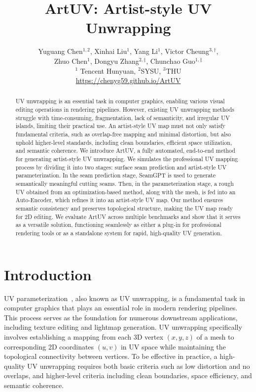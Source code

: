 \documentclass{article}
\title{ArtUV: Artist-style UV Unwrapping}
\author{
Yuguang Chen$^{1,2}$, Xinhai Liu$^{1}$, Yang Li$^{1}$, Victor Cheung$^{3,\dagger}$,\\ Zhuo Chen$^1$, Dongyu Zhang$^{2,\ddag}$, Chunchao Guo$^{1,\ddag}$ \\ \vspace{0.3cm}
$^1$ Tencent Hunyuan, $^2$SYSU, $^3$THU \\ \vspace{0.3cm}
\url{https://chenyg59.github.io/ArtUV}
}
\begin{document}
\maketitle

\begin{abstract}
UV unwrapping is an essential task in computer graphics, enabling various visual editing operations in rendering pipelines. However, existing UV unwrapping methods struggle with time-consuming, fragmentation, lack of semanticity, and irregular UV islands, limiting their practical use. An artist-style UV map must not only satisfy fundamental criteria, such as overlap-free mapping and minimal distortion, but also uphold higher-level standards, including clean boundaries, efficient space utilization, and semantic coherence.
We introduce ArtUV, a fully automated, end-to-end method for generating artist-style UV unwrapping. We simulates the professional UV mapping process by dividing it into two stages: surface seam prediction and artist-style UV parameterization. In the seam prediction stage, SeamGPT is used to generate semantically meaningful cutting seams. Then, in the parameterization stage, a rough UV obtained from an optimization-based method, along with the mesh, is fed into an Auto-Encoder, which refines it into an artist-style UV map. Our method ensures semantic consistency and preserves topological structure, making the UV map ready for 2D editing. We evaluate ArtUV across multiple benchmarks and show that it serves as a versatile solution, functioning seamlessly as either a plug-in for professional rendering tools or as a standalone system for rapid, high-quality UV generation.
\end{abstract}

\section{Introduction}
UV parameterization~\cite{floater2005surface, sheffer2007mesh}, also known as UV unwrapping, is a fundamental task in computer graphics that plays an essential role in modern rendering pipelines. This process serves as the foundation for numerous downstream applications, including texture editing and lightmap generation. UV unwrapping specifically involves establishing a mapping from each 3D vertex $(x,y,z)$ of a mesh to corresponding 2D coordinates $(u,v)$ in UV space while maintaining the topological connectivity between vertices. To be effective in practice, a high-quality UV unwrapping requires both basic criteria such as low distortion and no overlaps, and higher-level criteria including clean boundaries, space efficiency, and semantic coherence.
\end{document}
